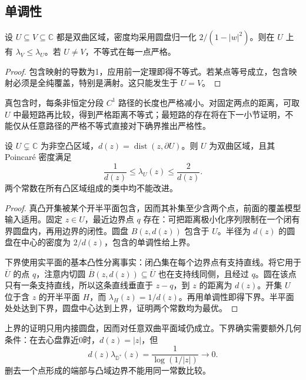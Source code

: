 \subsection{单调性}
\label{b3:subsec:130404}

\begin{corollary}[区域包含与密度]\label{b3:cor:13-density-monotonicity}
设 \(U\subseteq V\subseteq\mathbb C\) 都是双曲区域，密度均采用圆盘归一化 \(2/(1-|w|^2)\)。则在 \(U\) 上有 \(\lambda_V\le\lambda_U\)。若 \(U\ne V\)，不等式在每一点严格。
\end{corollary}
\begin{proof}
包含映射的导数为1，应用前一定理即得不等式。若某点等号成立，包含映射必须是全纯覆盖，特别是满射。这只能发生于 \(U=V\)。
\end{proof}
真包含时，每条非恒定分段 \(C^1\) 路径的长度也严格减小。对固定两点的距离，可取 \(U\) 中最短路再比较，得到严格距离不等式；最短路的存在将在下一小节证明，不能仅从任意路径的严格不等式直接对下确界推出严格性。

\begin{proposition}[凸域中的边界距离估计]\label{b3:prop:13-convex-boundary-distance}
设 \(U\subsetneq\mathbb C\) 为非空凸区域，\(d(z)=\operatorname{dist}(z,\partial U)\)。则 \(U\) 为双曲区域，且其 Poincaré 密度满足
\[
 \frac1{d(z)}\le\lambda_U(z)\le\frac2{d(z)}.
\]
两个常数在所有凸区域组成的类中均不能改进。
\end{proposition}
\begin{proof}
真凸开集被某个开半平面包含，因而其补集至少含两个点，前面的覆盖模型输入适用。固定 \(z\in U\)，最近边界点 \(q\) 存在：可把距离极小化序列限制在一个闭有界圆盘内，再用边界的闭性。圆盘 \(B(z,d(z))\) 包含于 \(U\)。半径为 \(d(z)\) 的圆盘在中心的密度为 \(2/d(z)\)，包含的单调性给上界。

下界使用实平面的基本凸性分离事实：闭凸集在每个边界点有支持直线。将它用于 \(\overline U\) 的点 \(q\)，注意内切圆 \(\overline B(z,d(z))\subseteq\overline U\) 也在支持线同侧，且经过 \(q\)。圆在该点只有一条支持直线，所以这条直线垂直于 \(z-q\)，到 \(z\) 的距离为 \(d(z)\)。开集 \(U\) 位于含 \(z\) 的开半平面 \(H\)，而 \(\lambda_H(z)=1/d(z)\)。再用单调性即得下界。半平面处处达到下界，圆盘中心达到上界，证明两个常数均为最优。
\end{proof}
上界的证明只用内接圆盘，因而对任意双曲平面域仍成立。下界确实需要额外几何条件：在去心盘靠近0时，\(d(z)=|z|\)，但
\[
 d(z)\lambda_{\mathbb D^*}(z)=\frac1{\log(1/|z|)}\longrightarrow0.
\]
删去一个点形成的端部与凸域边界不能用同一常数比较。

